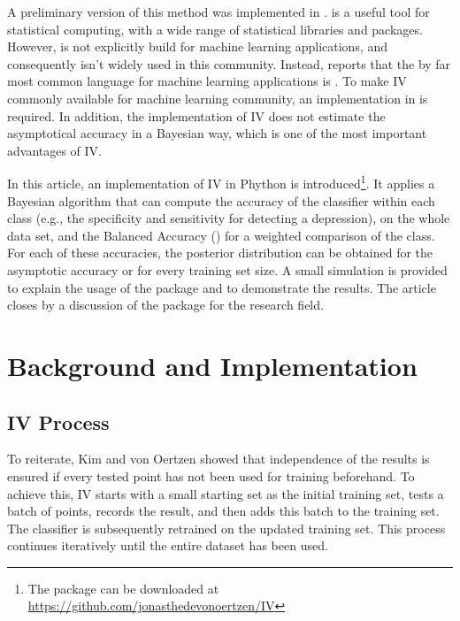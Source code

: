 \documentclass[article]{jss}
\begin{document}
A preliminary version of this method was implemented in  \citep{braun_independent_2023, r_development_core_team._r_2010}.  is a useful tool for statistical computing, with a wide range of statistical libraries and packages. However,  is not explicitly build for machine learning applications, and consequently  isn't widely used in this community. Instead, \citet{kaggle-survey-2022} reports that the by far most common language for machine learning applications is  \citep{van_rossum_python_1995}. To make IV commonly available for machine learning community, an implementation in  is required. In addition, the  implementation of IV does not estimate the asymptotical accuracy in a Bayesian way, which is one of the most important advantages of IV.

In this article, an implementation of IV in Phython is introduced\footnote{The package can be downloaded at \url{https://github.com/jonasthedevonoertzen/IV}}. It applies a Bayesian algorithm that can compute the accuracy of the classifier within each class (e.g., the specificity and sensitivity for detecting a depression), on the whole data set, and the Balanced Accuracy () for a weighted comparison of the class. For each of these accuracies, the posterior distribution can be obtained for the asymptotic accuracy or for every training set size. A small simulation is provided to explain the usage of the package and to demonstrate the results. The article closes by a discussion of the package for the research field.

\section{Background and Implementation} \label{sec:background}

\subsection{IV Process} \label{sec:iv_process}
To reiterate, Kim and von Oertzen \citep{kim_classifiers_2018} showed that independence of the results is ensured if every tested point has not been used for training beforehand. To achieve this, IV starts with a small starting set as the initial training set, tests a batch of points, records the result, and then adds this batch to the training set. The classifier is subsequently retrained on the updated training set. This process continues iteratively until the entire dataset has been used.
\end{document}

